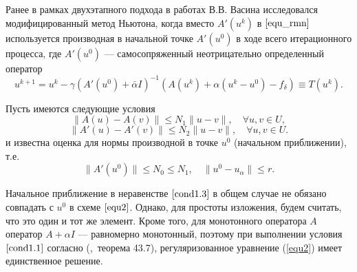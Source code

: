 Ранее в рамках двухэтапного подхода в работах В.В. Васина \cite{VasAkiMin2013, Vasin2014} исследовался модифицированный метод Ньютона, когда вместо $A'(u^k)$ в $\eqref{equ_rmn}$ используется производная в начальной точке $A'(u^0)$ в ходе всего итерационного процесса, где $A'(u^0)$ --- самосопряженный неотрицательно определенный оператор  
$$
u^{k+1}=u^k-\gamma(A'(u^0)+\bar\alpha I)^{-1}(A(u^k)+\alpha(u^k-u^0)-f_\delta)\equiv{T(u^k)}.
$$

Пусть имеются следующие условия
\begin{equation}\label{cond1.1}
\|A(u)-A(v)\|\le N_1\|u-v\|, \quad \forall u, v \in U,
\end{equation}
\begin{equation}\label{cond1.2}
\|A'(u)-A'(v)\|\le N_2\|u-v\|, \quad \forall u, v \in U.
\end{equation}
и известна оценка для нормы производной в точке $u^0$ (начальном приближении), т.е.
\begin{equation}\label{cond1.3}
\|A'(u^0)\| \le N_0\le N_1, \quad \|u^0-u_\alpha\| \le r.
\end{equation}
\begin{remark}
	Начальное приближение в неравенстве $\eqref{cond1.3}$ в общем случае не обязано совпадать с $u^0$ в схеме $\eqref{equ2}$. Однако, для простоты изложения, будем считать, что это один и тот же элемент. Кроме того, для монотонного оператора $A$ оператор $A+\alpha I$ --- равномерно монотонный, поэтому при выполнении условия $\ref{cond1.1}$ согласно (\cite{KufFuch1988},~теорема 43.7), регуляризованное уравнение (\ref{equ2}) имеет единственное решение.
\end{remark}

